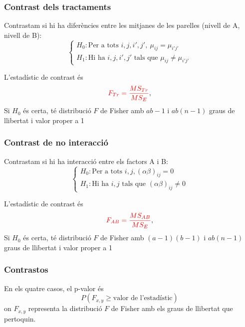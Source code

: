 \documentclass[12pt,t]{beamer}
\newcommand{\red}[1]{\textcolor{red}{#1}}
\renewcommand{\geq}{\geqslant}
\theoremstyle{plain}
\theoremstyle{definition}
\begin{document}
\begin{frame}
\frametitle{Contrast dels tractaments}

 Contrastam si  hi ha diferències entre les mitjanes de  les parelles (nivell de  A, nivell de  B):
$$
\left\{
\begin{array}{l}
H_0 : \mbox{Per a tots }i,j,i',j',\ \mu_{ij}=\mu_{i'j'} \\
H_1 :  \mbox{Hi ha } i,j,i',j'\mbox{ tals que } \mu_{ij}\neq \mu_{i'j'}
\end{array}
\right.
$$
\medskip

L'estadístic de contrast és
$$
\red{F_{Tr}=\frac{MS_{Tr}}{MS_E}},
$$
Si $H_0$ és certa, té
distribució $F$ de Fisher amb $ab-1$ i $ab(n-1)$ graus de llibertat i valor proper a 1

\end{frame}

\begin{frame}
\frametitle{Contrast de no interacció}

 Contrastam si  hi ha interacció entre
els factors A i B:
$$
\left\{
\begin{array}{l}
H_0 :  \mbox{Per a tots } i,j, (\alpha\beta)_{ij} =0 \\
H_1 :  \mbox{Hi ha } i,j\mbox{ tals que } (\alpha\beta)_{ij}
\not = 0
\end{array}
\right.
$$
\medskip

L'estadístic de contrast és
$$
\red{F_{AB} = \frac{MS_{AB}}{MS_E}},
$$
Si $H_0$ és certa, té
distribució $F$ de Fisher amb $(a-1)(b-1)$ i $ab(n-1)$ graus de
llibertat  i valor proper a 1

\end{frame}


\begin{frame}
\frametitle{Contrastos}

En els quatre casos, el p-valor és
$$
P(F_{x,y}\geq \mbox{valor de l'estadístic})
$$
on $F_{x,y}$ representa la distribució $F$ de Fisher amb els graus de llibertat que pertoquin.

\end{frame}
\end{document}
